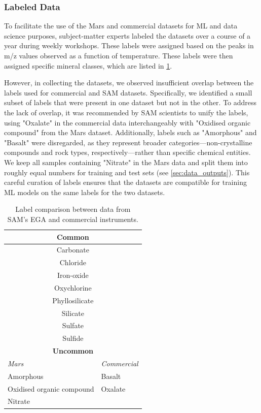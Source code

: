 \subsubsection{Labeled Data}

To facilitate the use of the Mars and commercial datasets for ML and data science purposes, subject-matter experts labeled the datasets over a course of a year during weekly workshops. These labels were assigned based on the peaks in m/z values observed as a function of temperature. These labels were then assigned specific mineral classes, which are listed in \cref{tab:label-comparison}.

However, in collecting the datasets, we observed insufficient overlap between the labels used for commercial and SAM datasets. Specifically, we identified a small subset of labels that were present in one dataset but not in the other. To address the lack of overlap, it was recommended by SAM scientists to unify the labels, using "Oxalate" in the commercial data interchangeably with "Oxidised organic compound" from the Mars dataset. Additionally, labels such as "Amorphous" and "Basalt" were disregarded, as they represent broader categories—non-crystalline compounds and rock types, respectively—rather than specific chemical entities. We keep all samples containing "Nitrate" in the Mars data and split them into roughly equal numbers for training and test sets (see \cref{sec:data_outputs}). This careful curation of labels ensures that the datasets are compatible for training ML models on the same labels for the two datasets.

\begin{table}[htbp]
    \centering
    \begin{tabular}{|p{25mm}|p{25mm}|}
        \hline
        \multicolumn{2}{|c|}{\textbf{Common}} \\
        \hline
        \multicolumn{2}{|c|}{Carbonate} \\
        \multicolumn{2}{|c|}{Chloride} \\
        \multicolumn{2}{|c|}{Iron-oxide} \\
        \multicolumn{2}{|c|}{Oxychlorine} \\
        \multicolumn{2}{|c|}{Phyllosilicate} \\
        \multicolumn{2}{|c|}{Silicate} \\
        \multicolumn{2}{|c|}{Sulfate} \\
        \multicolumn{2}{|c|}{Sulfide} \\
        \hline
        \multicolumn{2}{|c|}{\textbf{Uncommon}} \\
        \hline
        \textit{Mars} & \textit{Commercial} \\
        \hline
        Amorphous  & Basalt \\ 
        Oxidised organic compound & Oxalate \\
        Nitrate &  \\ 
        \hline
    \end{tabular}
    \caption{Label comparison between data from SAM's EGA and commercial instruments.}
    \label{tab:label-comparison}
\end{table}

